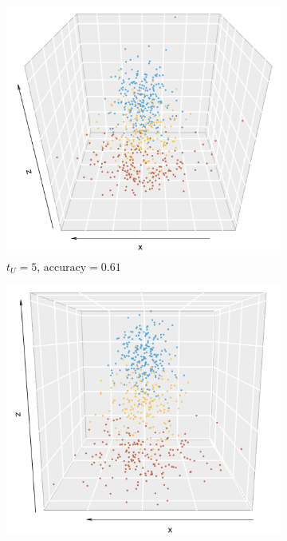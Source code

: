 \documentclass[10pt,journal,compsoc]{IEEEtran}
\numberwithin{equation}{section}
\begin{document}
\begin{figure}[htbp]
\centering
\begin{subfigure}{.49\columnwidth}
\includegraphics[width=\columnwidth]{svd_5.png}%
\caption{$t_U = 5$, $\text{accuracy} = 0.61$}
\end{subfigure}
\begin{subfigure}{.49\columnwidth}
\includegraphics[width=\columnwidth]{svd_6.png}%

\end{subfigure}
\end{figure}
\end{document}
